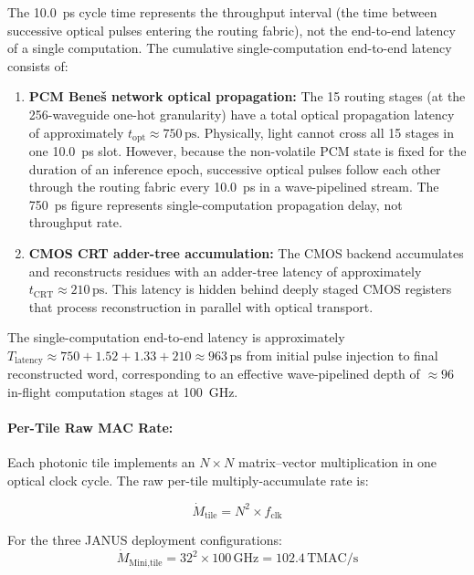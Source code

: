 \documentclass[journal]{IEEEtran}
\begin{document}
The 10.0~ps cycle time represents the throughput interval (the time between successive optical pulses entering the routing fabric), not the end-to-end latency of a single computation. The cumulative single-computation end-to-end latency consists of:

\begin{enumerate}
\item \textbf{PCM Beneš network optical propagation:} The 15 routing stages (at the 256-waveguide one-hot granularity) have a total optical propagation latency of approximately $t_{\text{opt}} \approx 750\,\text{ps}$. Physically, light cannot cross all 15 stages in one 10.0~ps slot. However, because the non-volatile PCM state is fixed for the duration of an inference epoch, successive optical pulses follow each other through the routing fabric every 10.0~ps in a wave-pipelined stream. The 750~ps figure represents single-computation propagation delay, not throughput rate.

\item \textbf{CMOS CRT adder-tree accumulation:} The CMOS backend accumulates and reconstructs residues with an adder-tree latency of approximately $t_{\text{CRT}} \approx 210\,\text{ps}$. This latency is hidden behind deeply staged CMOS registers that process reconstruction in parallel with optical transport.
\end{enumerate}

The single-computation end-to-end latency is approximately $T_{\text{latency}} \approx 750 + 1.52 + 1.33 + 210 \approx 963\,\text{ps}$ from initial pulse injection to final reconstructed word, corresponding to an effective wave-pipelined depth of $\approx 96$ in-flight computation stages at 100~GHz.

\paragraph{\textbf{Per-Tile Raw MAC Rate:}}
Each photonic tile implements an $N \times N$ matrix--vector multiplication in one optical clock cycle. The raw per-tile multiply-accumulate rate is:

\begin{equation}
\dot{M}_{\text{tile}} = N^2 \times f_{\text{clk}}
\end{equation}

For the three JANUS deployment configurations:
\begin{equation}
\dot{M}_{\text{Mini,tile}} = 32^2 \times 100\,\text{GHz} = 102.4\,\text{TMAC/s}
\end{equation}
\end{document}
